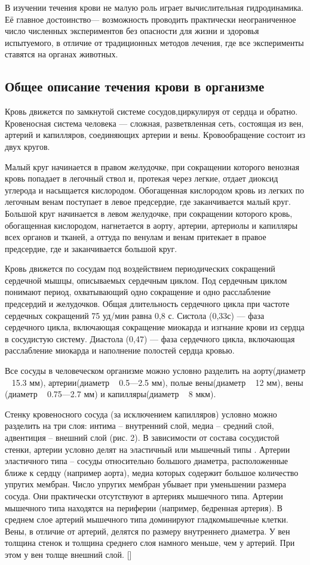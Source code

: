 \documentclass[a4paper, 14pt]{article}
\begin{document}
В изучении течения крови не малую роль играет вычислительная гидродинамика. Её главное достоинство— возможность проводить практически неограниченное число численных экспериментов без опасности для жизни и здоровья испытуемого, в отличие от традиционных методов лечения, где все эксперименты ставятся на органах животных.

\subsection{Общее описание течения крови в организме}
Кровь движется по замкнутой системе сосудов,циркулируя от сердца и обратно. Кровеносная система человека — сложная, разветвленная сеть, состоящая из вен, артерий и капилляров, соединяющих артерии и вены. Кровообращение состоит из двух кругов.

Малый круг начинается в правом желудочке, при сокращении которого венозная кровь попадает в легочный ствол и, протекая через легкие, отдает диоксид углерода и насыщается кислородом. Обогащенная кислородом кровь из легких по легочным венам поступает в левое предсердие, где заканчивается малый круг. Большой круг начинается в левом желудочке, при сокращении которого кровь, обогащенная кислородом, нагнетается в аорту, артерии, артериолы и капилляры всех органов и тканей, а оттуда по венулам и венам притекает в правое предсердие, где и заканчивается большой круг.

Кровь движется по сосудам под воздействием периодических сокращений сердечной мышцы, описываемых сердечным циклом. Под сердечным циклом понимают период, охватывающий одно сокращение и одно расслабление предсердий и желудочков. Общая длительность сердечного цикла при частоте сердечных сокращений 75 уд/мин равна 0,8 с. Систола (0,33с) — фаза сердечного цикла, включающая сокращение миокарда и изгнание крови из сердца в сосудистую систему. Диастола (0,47) — фаза сердечного цикла, включающая расслабление миокарда и наполнение полостей сердца кровью.

Все сосуды в человеческом организме можно условно разделить на аорту(диаметр ~ 15.3 мм), артерии(диаметр ~ 0.5—2.5 мм), полые вены(диаметр ~ 12 мм), вены (диаметр ~ 0.75—2.7 мм) и капилляры(диаметр ~ 8 мкм).

Стенку кровеносного сосуда (за исключением капилляров) условно можно разделить на три слоя: интима – внутренний слой, медиа – средний слой, адвентиция – внешний слой (рис. 2).
В зависимости от состава сосудистой стенки, артерии условно делят на эластичный или мышечный типы . Артерии эластичного типа – сосуды относительно большого диаметра, расположенные ближе к сердцу (например аорта), медиа которых содержит большое количество упругих мембран. Число упругих мембран убывает при уменьшении размера сосуда. Они практически отсутствуют в артериях мышечного типа. Артерии мышечного типа находятся на периферии (например, бедренная артерия). В среднем слое артерий мышечного типа доминируют гладкомышечные клетки. Вены, в отличие от артерий, делятся по размеру внутреннего диаметра. У вен толщина стенок и толщина среднего слоя намного меньше, чем у артерий. При этом у вен толще внешний слой. [\cite{rhodin:1980}] 
\end{document}
